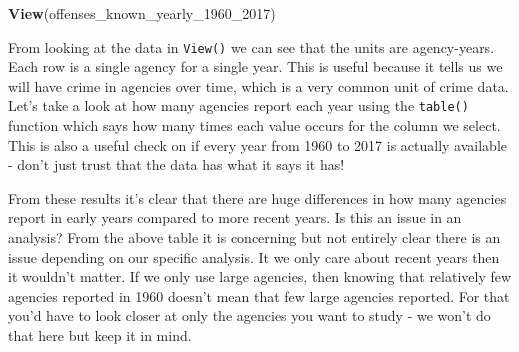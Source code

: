 \documentclass[
  12pt,
]{book}
\newenvironment{Shaded}{\begin{snugshade}}{\end{snugshade}}
\newcommand{\CommentTok}[1]{\textcolor[rgb]{0.56,0.35,0.01}{\textit{#1}}}
\newcommand{\DecValTok}[1]{\textcolor[rgb]{0.00,0.00,0.81}{#1}}
\newcommand{\KeywordTok}[1]{\textcolor[rgb]{0.13,0.29,0.53}{\textbf{#1}}}
\newcommand{\NormalTok}[1]{#1}
\newcommand{\OperatorTok}[1]{\textcolor[rgb]{0.81,0.36,0.00}{\textbf{#1}}}
\begin{document}
\begin{Shaded}
\begin{Highlighting}[]
\KeywordTok{View}\NormalTok{(offenses\_known\_yearly\_}\DecValTok{1960}\NormalTok{\_}\DecValTok{2017}\NormalTok{)}
\end{Highlighting}
\end{Shaded}

From looking at the data in \texttt{View()} we can see that the units are agency-years. Each row is a single agency for a single year. This is useful because it tells us we will have crime in agencies over time, which is a very common unit of crime data. Let's take a look at how many agencies report each year using the \texttt{table()} function which says how many times each value occurs for the column we select. This is also a useful check on if every year from 1960 to 2017 is actually available - don't just trust that the data has what it says it has!

\begin{Shaded}
\end{Shaded}

From these results it's clear that there are huge differences in how many agencies report in early years compared to more recent years. Is this an issue in an analysis? From the above table it is concerning but not entirely clear there is an issue depending on our specific analysis. It we only care about recent years then it wouldn't matter. If we only use large agencies, then knowing that relatively few agencies reported in 1960 doesn't mean that few large agencies reported. For that you'd have to look closer at only the agencies you want to study - we won't do that here but keep it in mind.
\end{document}
